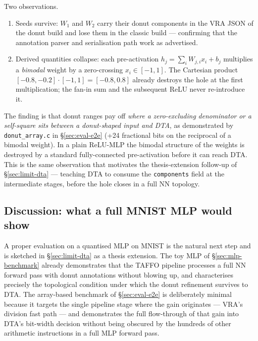 \documentclass[11pt,a4paper]{article}
\theoremstyle{plain}
\begin{document}
Two observations.

\begin{enumerate}[leftmargin=1.5em]
\item Seeds survive: $W_1$ and $W_2$ carry their donut components in
  the VRA JSON of the donut build and lose them in the classic
  build --- confirming that the annotation parser and serialisation
  path work as advertised.
\item Derived quantities collapse: each pre-activation
  $h_j = \sum_i W_{j,i} x_i + b_j$ multiplies a \emph{bimodal} weight
  by a zero-crossing $x_i \in [-1, 1]$. The Cartesian product
  $[-0.8,-0.2] \cdot [-1,1] = [-0.8, 0.8]$ already destroys the hole
  at the first multiplication; the fan-in sum and the subsequent ReLU
  never re-introduce it.
\end{enumerate}

The finding is that donut ranges pay off \emph{where a
zero-excluding denominator or a self-square sits between a
donut-shaped input and DTA}, as demonstrated by
\texttt{donut\_array.c} in \S\ref{sec:eval-e2e} (+24 fractional bits
on the reciprocal of a bimodal weight). In a plain ReLU-MLP the
bimodal structure of the weights is destroyed by a standard
fully-connected pre-activation before it can reach DTA. This is the
same observation that motivates the thesis-extension follow-up of
\S\ref{sec:limit-dta} --- teaching DTA to consume the
\texttt{components} field at the intermediate stages, before the
hole closes in a full NN topology.

\subsection{Discussion: what a full MNIST MLP would show}

A proper evaluation on a quantised MLP on MNIST is the natural next
step and is sketched in \S\ref{sec:limit-dta} as a thesis extension.
The toy MLP of \S\ref{sec:mlp-benchmark} already demonstrates that
the TAFFO pipeline processes a full NN forward pass with donut
annotations without blowing up, and characterises precisely the
topological condition under which the donut refinement survives to
DTA. The array-based benchmark of \S\ref{sec:eval-e2e} is
deliberately minimal because it targets the single pipeline stage
where the gain originates --- VRA's division fast path --- and
demonstrates the full flow-through of that gain into DTA's bit-width
decision without being obscured by the hundreds of other arithmetic
instructions in a full MLP forward pass.
\end{document}
